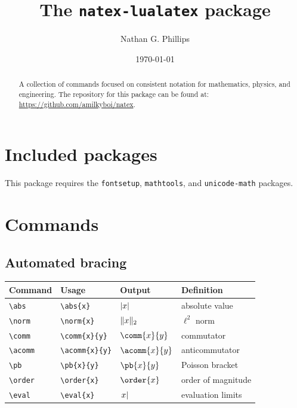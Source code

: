 \documentclass[11pt]{article}
\title{The \texttt{natex-lualatex} package}
\author{Nathan G. Phillips}
\date{\today}
\begin{document}
\maketitle

\begin{abstract}
    A collection of commands focused on consistent notation for mathematics, physics, and engineering. The repository for this package can be found at: \url{https://github.com/amilkyboi/natex}.
\end{abstract}

\tableofcontents

\newpage
\section{Included packages}

This package requires the \verb|fontsetup|, \verb|mathtools|, and \verb|unicode-math| packages.

\newpage
\section{Commands}

\subsection{Automated bracing}

\begin{tabular}{llll}
    Command       & Usage                 & Output           & Definition         \\
    \hline
    \verb|\abs|   & \verb|\abs{x}|        & $\lvert x\rvert$        & absolute value     \\
    \verb|\norm|  & \verb|\norm{x}|       & $\lVert x\rVert_{2}$       & $\ell^2$ norm      \\
    \verb|\comm|  & \verb|\comm{x}{y}|    & $\comm{x}{y}$    & commutator         \\
    \verb|\acomm| & \verb|\acomm{x}{y}|   & $\acomm{x}{y}$   & anticommutator     \\
    \verb|\pb|    & \verb|\pb{x}{y}|      & $\pb{x}{y}$      & Poisson bracket    \\
    \verb|\order| & \verb|\order{x}|      & $\order{x}$      & order of magnitude \\
    \verb|\eval|  & \verb|\eval{x}|       & $\left.x\right\rvert$       & evaluation limits  \\
\end{tabular}
\end{document}
